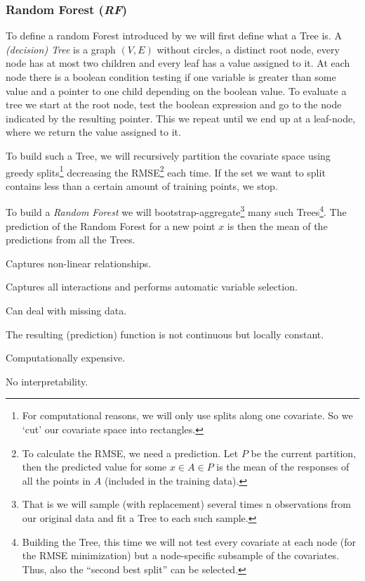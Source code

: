 \subsubsection*{Random Forest (\textit{RF})}{
    To define a random Forest introduced by \cite{breimanRandomForests2001}  we will first define what a Tree is. A \textit{(decision) Tree} is a graph $(V,E)$ without circles, a distinct root node, every node has at most two children and every leaf has a value assigned to it. At each node there is a boolean condition testing if one variable is greater than some value and a pointer to one child depending on the boolean value. To evaluate a tree we start at the root node, test the boolean expression and go to the node indicated by the resulting pointer. This we repeat until we end up at a leaf-node, where we return the value assigned to it. 
    
    To build such a Tree, we will recursively partition the covariate space using greedy splits\footnote{For computational reasons, we will only use splits along one covariate. So we `cut' our covariate space into rectangles.} decreasing the RMSE\footnote{To calculate the RMSE, we need a prediction. Let $P$ be the current partition, then the predicted value for some $x\in A \in P$ is the mean of the responses of all the points in $A$ (included in the training data).} each time. If the set we want to split contains less than a certain amount of training points, we stop.
    
    To build a \textit{Random Forest} we will bootstrap-aggregate\footnote{That is we will sample (with replacement) several times n observations from our original data and fit a Tree to each such sample.} many such Trees\footnote{Building the Tree, this time we will not test every covariate at each node (for the RMSE minimization) but a node-specific subsample of the covariates. Thus, also the ``second best split'' can be selected.}. The prediction of the Random Forest for a new point $x$ is then the mean of the predictions from all the Trees. 
    \begin{my_pros_cons_table}{
        \item Captures non-linear relationships.
        \item Captures all interactions and performs automatic variable selection.
        \item Can deal with missing data.
    }{
        \item The resulting (prediction) function is not continuous but locally constant.
        \item Computationally expensive.
        \item No interpretability.
    }
    \end{my_pros_cons_table}
}
